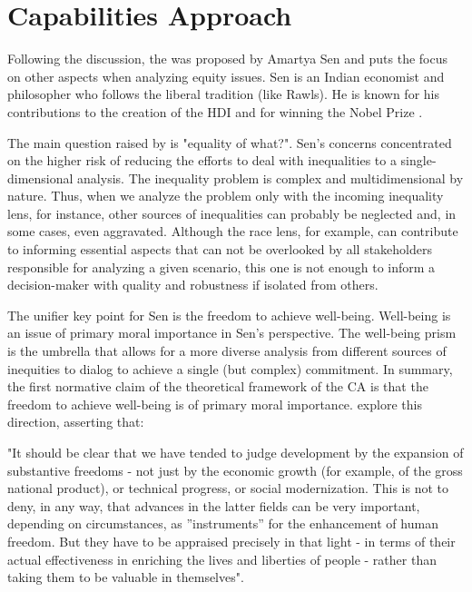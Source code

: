 \section{Capabilities Approach}
\label{equity-sec:sen-ca}

Following the discussion, the  was proposed by Amartya Sen and puts the focus on other aspects when analyzing equity issues. Sen is an Indian economist and philosopher who follows the liberal tradition (like Rawls). He is known for his contributions to the creation of the \gls{HDI} \cite{bomfim:2012} and for winning the Nobel Prize \cite{nobel:2022}.

The main question raised by  is "equality of what?". Sen's concerns concentrated on the higher risk of reducing the efforts to deal with inequalities to a single-dimensional analysis. The inequality problem is complex and multidimensional by nature. Thus, when we analyze the problem only with the incoming inequality lens, for instance, other sources of inequalities can probably be neglected and, in some cases, even aggravated. Although the race lens, for example, can contribute to informing essential aspects that can not be overlooked by all stakeholders responsible for analyzing a given scenario, this one is not enough to inform a decision-maker with quality and robustness if isolated from others.

The unifier key point for Sen is the freedom to achieve well-being. Well-being is an issue of primary moral importance in Sen's perspective. The well-being prism is the umbrella that allows for a more diverse analysis from different sources of inequities to dialog to achieve a single (but complex) commitment. In summary, the first normative claim of the theoretical framework of the \gls{CA} is that the freedom to achieve well-being is of primary moral importance.  explore this direction, asserting that:
\begin{citacao}
    "It should be clear that we have tended to judge development by the expansion of substantive freedoms - not just by the economic growth (for example, of the gross national product), or technical progress, or social modernization. This is not to deny, in any way, that advances in the latter fields can be very important, depending on circumstances, as ''instruments'' for the enhancement of human freedom. But they have to be appraised precisely in that light - in terms of their actual effectiveness in enriching the lives and liberties of people - rather than taking them to be valuable in themselves".
\end{citacao}

